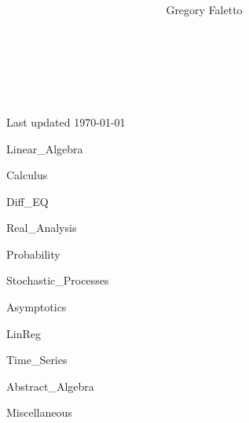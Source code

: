 \documentclass{article}
\title{
    \vspace{2in}
    \textmd{\textbf{ \hmwkTitle}}\\
}
\author{Gregory Faletto}
\date{}
\theoremstyle{definition}
\numberwithin{theorem}{section}
\theoremstyle{definition}
\theoremstyle{definition}
\theoremstyle{definition}
\theoremstyle{definition}
\begin{document}
\maketitle

\pagebreak

\tableofcontents

\

\

\begin{center}
Last updated \today
\end{center}



\newpage

{Linear_Algebra}

\pagebreak

{Calculus}

\pagebreak

{Diff_EQ}

\pagebreak

{Real_Analysis}

\pagebreak

{Probability}

\pagebreak

{Stochastic_Processes}

\pagebreak

{Asymptotics}

\pagebreak

{LinReg}

\pagebreak

{Time_Series}

\pagebreak

{Abstract_Algebra}

\pagebreak

{Miscellaneous}
\end{document}
